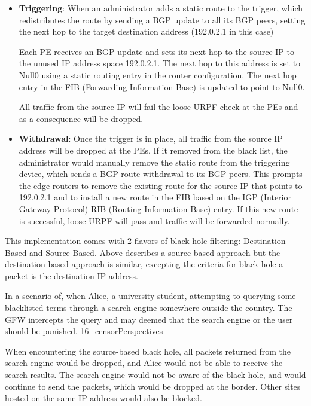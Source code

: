\begin{itemize}
\item
  \textbf{Triggering}: When an administrator adds a static route to the
  trigger, which redistributes the route by sending a BGP update to all
  its BGP peers, setting the next hop to the target destination address
  (192.0.2.1 in this case)

  Each PE receives an BGP update and sets its next hop to the source IP
  to the unused IP address space 192.0.2.1. The next hop to this address
  is set to Null0 using a static routing entry in the router
  configuration. The next hop entry in the FIB (Forwarding Information
  Base) is updated to point to Null0.

  All traffic from the source IP will fail the loose URPF check at the
  PEs and as a consequence will be dropped.
\item
  \textbf{Withdrawal}: Once the trigger is in place, all traffic from
  the source IP address will be dropped at the PEs. If it removed from
  the black list, the administrator would manually remove the static
  route from the triggering device, which sends a BGP route withdrawal
  to its BGP peers. This prompts the edge routers to remove the existing
  route for the source IP that points to 192.0.2.1 and to install a new
  route in the FIB based on the IGP (Interior Gateway Protocol) RIB
  (Routing Information Base) entry. If this new route is successful,
  loose URPF will pass and traffic will be forwarded normally.
\end{itemize}

This implementation comes with 2 flavors of black hole filtering:
Destination-Based and Source-Based. Above describes a source-based
approach but the destination-based approach is similar, excepting the
criteria for black hole a packet is the destination IP address.

In a scenario of, when Alice, a university student, attempting to
querying some blacklisted terms through a search engine somewhere
outside the country. The GFW intercepts the query and may deemed that
the search engine or the user should be punished. 16\_censorPerspectives

When encountering the source-based black hole, all packets returned from
the search engine would be dropped, and Alice would not be able to
receive the search results. The search engine would not be aware of the
black hole, and would continue to send the packets, which would be
dropped at the border. Other sites hosted on the same IP address would
also be blocked.

